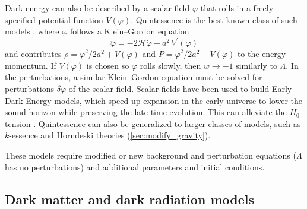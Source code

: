 \documentclass[USenglish, thumbmarks]{uiophdthesis} %
\newcommand\calH{\mathcal{H}}
\newcommand\KG{Klein--Gordon}
\begin{document}
Dark energy can also be described by a scalar field $\varphi$ that rolls in a freely specified potential function $V(\varphi)$.
Quintessence is the best known class of such models
\cite{ratraCosmologicalConsequencesRolling1988,caldwellCosmologicalImprintEnergy1998,tsujikawaQuintessenceReview2013},
where $\varphi$ follows a \KG{} equation
\begin{equation}
\ddot{\varphi} = -2\calH\dot{\varphi} - a^2 \, V^\prime(\varphi)
\label{eq:kg}
\end{equation}
and contributes $\rho = \dot{\varphi}^2 / 2 a^2 + V(\varphi)$ and $P = \dot{\varphi}^2 / 2 a^2 - V(\varphi)$
to the energy-momentum.
If $V(\varphi)$ is chosen so $\varphi$ rolls slowly, then $w \rightarrow -1$ similarly to $\Lambda$.
In the perturbations, a similar \KG{} equation must be solved for perturbations $\delta\varphi$ of the scalar field.
Scalar fields have been used to build Early Dark Energy models,
which speed up expansion in the early universe to lower the sound horizon
while preserving the late-time evolution.
This can alleviate the $H_0$ tension
\cite[e.g.][]{doranEarlyDarkEnergy2006,kamionkowskiDarkEnergyString2014,poulinCosmologicalImplicationsUltralight2018,poulinEarlyDarkEnergy2019,kamionkowskiHubbleTensionEarly2023,poulinUpsDownsEarly2023}.
Quintessence can also be generalized to larger classes of models,
such as $k$-essence and Horndeski theories (\cref{sec:modify_gravity}).

These models require modified or new background and perturbation equations
($\Lambda$ has no perturbations)
and additional parameters and initial conditions.

\subsection{Dark matter and dark radiation models}
\label{sec:modify_dm}
\end{document}
